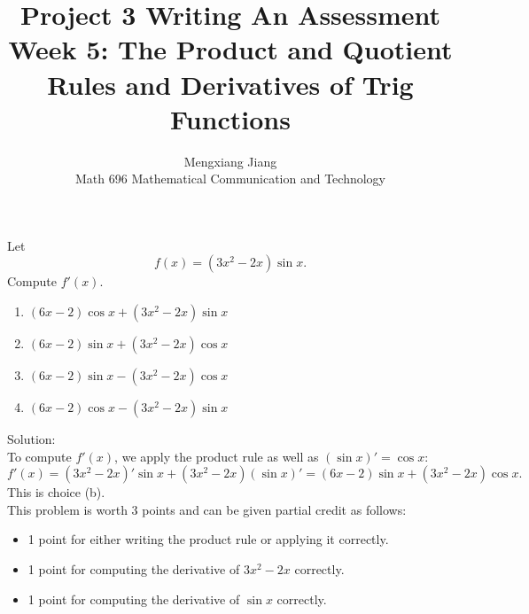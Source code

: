\documentclass[12pt]{article}
\newenvironment{problem}[2][Problem]{\begin{trivlist}
\item[\hskip \labelsep {\bfseries #1}\hskip \labelsep {\bfseries #2.}]}
{\end{trivlist}}
\begin{document}
 
 
\title{Project 3 Writing An Assessment
\\ Week 5: The Product and Quotient Rules and Derivatives of Trig Functions}
\author{Mengxiang Jiang\\ %
Math 696 Mathematical Communication and Technology} %
 
\maketitle
 
\begin{problem}{1} %
Let
\[
  f(x) = (3x^2 - 2x)\sin x.
\]
Compute $f'(x)$.

\begin{enumerate}
  \item $(6x - 2)\cos x +(3x^2 - 2x)\sin x$
  \item $(6x - 2)\sin x +(3x^2 - 2x)\cos x$
  \item $(6x - 2)\sin x -(3x^2 - 2x)\cos x$
  \item $(6x - 2)\cos x -(3x^2 - 2x)\sin x$
\end{enumerate}
Solution:\\
To compute $f'(x)$, we apply the product rule as well as $(\sin x)' = \cos x$:
\[
  f'(x) = (3x^2 - 2x)'\sin x + (3x^2 - 2x)(\sin x)' 
  = (6x - 2)\sin x + (3x^2 - 2x)\cos x.
\]
This is choice (b).\\
This problem is worth 3 points and can be given partial credit as follows:
\begin{itemize}
  \item 1 point for either writing the product rule or applying it correctly.
  \item 1 point for computing the derivative of $3x^2 - 2x$ correctly.
  \item 1 point for computing the derivative of $\sin x$ correctly.
\end{itemize}
\end{problem}

\pagebreak
\end{document}
